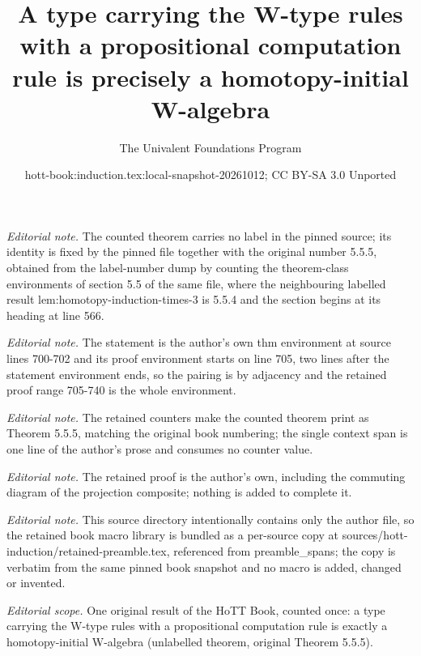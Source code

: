 \documentclass[10pt,a4paper]{article}
\title{A type carrying the W-type rules with a propositional computation rule is precisely a homotopy-initial W-algebra}
\author{The Univalent Foundations Program}
\date{hott-book:induction.tex:local-snapshot-20261012; CC BY-SA 3.0 Unported}
\newcounter{chapter}
\theoremstyle{definition}
\theoremstyle{remark}
\numberwithin{equation}{section}
\begin{document}
\maketitle
\setcounter{chapter}{5}
\setcounter{section}{5}
\setcounter{thm}{4}
\noindent\textit{Editorial note.} The counted theorem carries no label in the pinned source; its identity is fixed by the pinned file together with the original number 5.5.5, obtained from the label-number dump by counting the theorem-class environments of section 5.5 of the same file, where the neighbouring labelled result lem:homotopy-induction-times-3 is 5.5.4 and the section begins at its heading at line 566.\par\medskip
\noindent\textit{Editorial note.} The statement is the author's own thm environment at source lines 700-702 and its proof environment starts on line 705, two lines after the statement environment ends, so the pairing is by adjacency and the retained proof range 705-740 is the whole environment.\par\medskip
\noindent\textit{Editorial note.} The retained counters make the counted theorem print as Theorem 5.5.5, matching the original book numbering; the single context span is one line of the author's prose and consumes no counter value.\par\medskip
\noindent\textit{Editorial note.} The retained proof is the author's own, including the commuting diagram of the projection composite; nothing is added to complete it.\par\medskip
\noindent\textit{Editorial note.} This source directory intentionally contains only the author file, so the retained book macro library is bundled as a per-source copy at sources/hott-induction/retained-preamble.tex, referenced from preamble\_spans; the copy is verbatim from the same pinned book snapshot and no macro is added, changed or invented.\par\medskip
\noindent\textit{Editorial scope.} One original result of the HoTT Book, counted once: a type carrying the W-type rules with a propositional computation rule is exactly a homotopy-initial W-algebra (unlabelled theorem, original Theorem 5.5.5).\par\medskip
\end{document}
